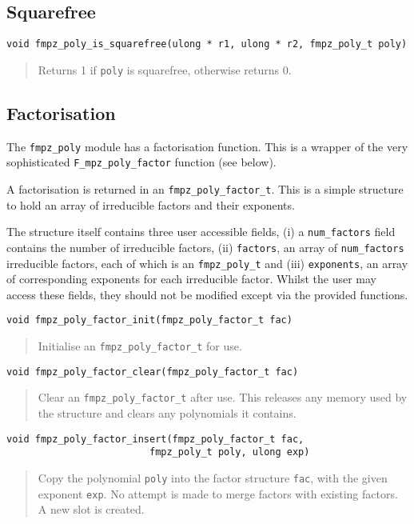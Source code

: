\documentclass[a4paper,10pt]{article}
\newcommand{\code}{\lstinline}
\begin{document}
\subsection{Squarefree}

\begin{lstlisting}
void fmpz_poly_is_squarefree(ulong * r1, ulong * r2, fmpz_poly_t poly)
\end{lstlisting}
\begin{quote}
Returns 1 if \code{poly} is squarefree, otherwise returns 0.
\end{quote}

\subsection{Factorisation}

The \code{fmpz_poly} module has a factorisation function. This is a wrapper of the very sophisticated
\code{F_mpz_poly_factor} function (see below). 

A factorisation is returned in an \code{fmpz_poly_factor_t}. This is a simple structure to hold an array 
of irreducible factors and their exponents.

The structure itself contains three user accessible fields, (i) a \code{num_factors} field contains the
number of irreducible factors, (ii) \code{factors}, an array of \code{num_factors} irreducible factors,
each of which is an \code{fmpz_poly_t} and (iii) \code{exponents}, an array of corresponding exponents
for each irreducible factor. Whilst the user may access these fields, they should not be modified except
via the provided functions.

\begin{lstlisting}
void fmpz_poly_factor_init(fmpz_poly_factor_t fac)
\end{lstlisting}
\begin{quote}
Initialise an \code{fmpz_poly_factor_t} for use.
\end{quote}

\begin{lstlisting}
void fmpz_poly_factor_clear(fmpz_poly_factor_t fac)
\end{lstlisting}
\begin{quote}
Clear an \code{fmpz_poly_factor_t} after use. This releases any memory used by the structure and clears
any polynomials it contains.
\end{quote}

\begin{lstlisting}
void fmpz_poly_factor_insert(fmpz_poly_factor_t fac, 
                         fmpz_poly_t poly, ulong exp)
\end{lstlisting}
\begin{quote}
Copy the polynomial \code{poly} into the factor structure \code{fac}, with the given exponent \code{exp}.
No attempt is made to merge factors with existing factors. A new slot is created. 
\end{quote}
\end{document}
